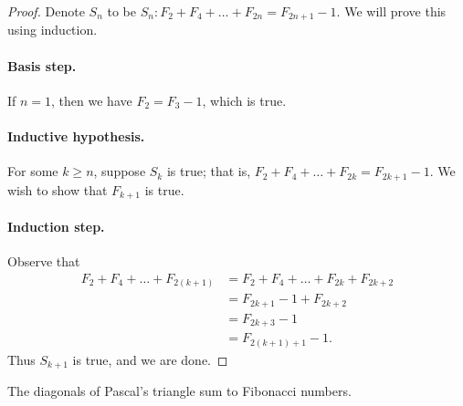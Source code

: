 \documentclass{exam}
\begin{document}
\begin{proof}
    Denote $S_n$ to be $S_n: F_2 + F_4 + \dots + F_{2n} = F_{2n+1}-1$. We will prove this using induction.

    \paragraph{Basis step.} If $n=1$, then we have $F_2 = F_3 - 1$, which is true.

    \paragraph{Inductive hypothesis.} For some $k\ge n$, suppose $S_k$ is true; that is, $F_2 + F_4 + \dots + F_{2k} = F_{2k+1}-1$. We wish to show that $F_{k+1}$ is true.

    \paragraph{Induction step.} Observe that
    \begin{align*}
        F_2 + F_4 + \dots + F_{2(k+1)} &= F_2 + F_4 + \dots + F_{2k} + F_{2k + 2}\\
        &= F_{2k + 1} -1 + F_{2k + 2}\\
        &= F_{2k + 3} - 1\\
        &= F_{2(k + 1) + 1} - 1.
    \end{align*}
    Thus $S_{k+1}$ is true, and we are done.
\end{proof}

\begin{proposition}{10.29}
    The diagonals of Pascal's triangle sum to Fibonacci numbers.
\end{proposition}
\end{document}
